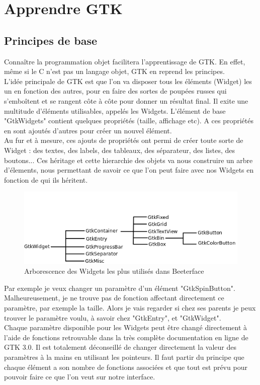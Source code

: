 \documentclass[11pt,french,a4paper]{report}
\begin{document}
\section{Apprendre GTK}
    \subsection{Principes de base}
Connaître la programmation objet facilitera l'apprentissage de GTK. En effet, même si le C n'est pas un langage objet,
GTK en reprend les principes. \\
L'idée principale de GTK est que l'on va disposer tous les éléments (Widget) les un en fonction des autres, pour en faire des sortes de 
poupées russes qui s'emboîtent et se rangent côte à côte pour donner un résultat final. Il exite une multitude d'éléments utilisables, 
appelés les Widgets. L'élément de base "GtkWidgets" contient quelques propriétés (taille, affichage etc). 
A ces propriétés en sont ajoutés d'autres pour créer un nouvel élément. \\
Au fur et à mesure, ces ajouts de propriétés ont permi de créer toute sorte de Widget : des textes, des labels, des tableaux, 
des séparateur, des listes, des boutons... 
Ces héritage et cette hierarchie des objets va nous construire un arbre d'élements, nous permettant de savoir ce que l'on peut 
faire avec nos Widgets en fonction de qui ils héritent. 
\begin{figure} [h!]
    \centering
        \includegraphics[scale=0.7]{../images/dia/arbo_widget.png} 
        \caption{Arborescence des Widgets les plus utilisés dans Beeterface}
        \label{arbo_widg}
\end{figure}
Par exemple je veux changer un paramètre d'un élément "GtkSpinButton". Malheureusement, je ne trouve pas de fonction 
affectant directement ce paramètre, par exemple la taille. Alors je vais regarder si chez ses parents je peux trouver 
le paramètre voulu, à savoir chez "GtkEntry", et "GtkWidget". \\

Chaque paramètre disponible pour les Widgets peut être changé directement à l'aide de fonctions retrouvable dans la très complète 
documentation en ligne de GTK 3.0. Il est totalement déconseillé de changer directement la valeur des paramètres à la mains 
en utilisant les pointeurs. Il faut partir du principe que chaque élément a son nombre de fonctions associées 
et que tout est prévu pour pouvoir faire ce que l'on veut sur notre interface. \\ 
\end{document}
